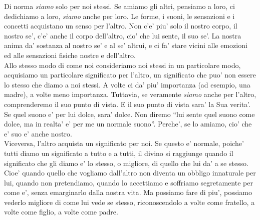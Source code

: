 Di norma \emph{siamo} solo per noi stessi. Se amiamo gli altri, pensiamo a loro, ci dedichiamo a loro, \emph{siamo} anche per loro. Le forme, i suoni, le sensazioni e i concetti acquistano un senso per l'altro. Non c'e' piu' solo il nostro corpo, il nostro se', c'e' anche il corpo dell'altro, cio' che lui sente, il suo se'. La nostra anima da' sostanza al nostro se' e al se' altrui, e ci fa' stare vicini alle emozioni ed alle sensazioni fisiche nostre e dell'altro. \\
Allo stesso modo di come noi consideriamo noi stessi in un particolare modo, acquisiamo un particolare significato per l'altro, un significato che puo' non essere lo stesso che diamo a noi stessi. A volte ci da' piu' importanza (ad esempio, una madre), a volte meno importanza. Tuttavia, se veramente \emph{siamo} anche per l'altro, comprenderemo il suo punto di vista. E il suo punto di vista sara' la Sua verita'. Se quel suono e' per lui dolce, sara' dolce. Non diremo ``lui sente quel suono come dolce, ma in realta' e' per me un normale suono''. Perche', se lo amiamo, cio' che e' suo e' anche nostro.\\
Viceversa, l'altro acquista un significato per noi. Se questo e' normale, poiche' tutti diamo un significato a tutto e a tutti, il divino si raggiunge quando il significato che gli diamo e' lo stesso, o migliore, di quello che lui da' a se stesso. Cioe' quando quello che vogliamo dall'altro non diventa un obbligo innaturale per lui, quando non pretendiamo, quando lo accettiamo e soffriamo segretamente per come e', senza emarginarlo dalla nostra vita. Ma possiamo fare di piu', possiamo vederlo migliore di come lui vede se stesso, riconoscendolo a volte come fratello, a volte come figlio, a volte come padre.

